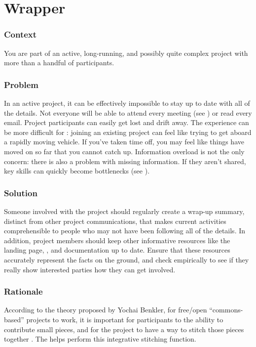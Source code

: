 
\section{Wrapper}\label{sec:Wrapper}

\subsubsection*{Context} You are part of an active, long-running, and possibly quite complex project with more than a handful of participants.  

\subsubsection*{Problem} In an active project, it can be effectively impossible to stay up to date with all of the details.  Not everyone will be able to attend every meeting (see ) or read every email.  Project participants can easily get lost and drift away.  The experience can be more difficult for : joining an existing project can feel like trying to get aboard a rapidly moving vehicle.  If you've taken time off, you may feel like things have moved on so far that you cannot catch up.  Information overload is not the only concern: there is also a problem with missing information.  If they aren't shared, key skills can quickly become bottlenecks (see ).

\subsubsection*{Solution}
Someone involved with the project should regularly create a wrap-up summary, distinct from other project communications, that makes current activities comprehensible to people who may not have been following all of the details.  In addition, project members should keep other informative resources like the landing page, , and documentation up to date.  Ensure that these resources accurately represent the facts on the ground, and check empirically to see if they really show interested parties how they can get involved.

\subsubsection*{Rationale}
According to the theory proposed by Yochai Benkler, for free/open ``commons-based'' projects to work, it is important for participants to the ability to contribute small pieces, and for the project to have a way to stitch those pieces together \cite{coases-penguin}.  The  helps perform this integrative stitching function.

